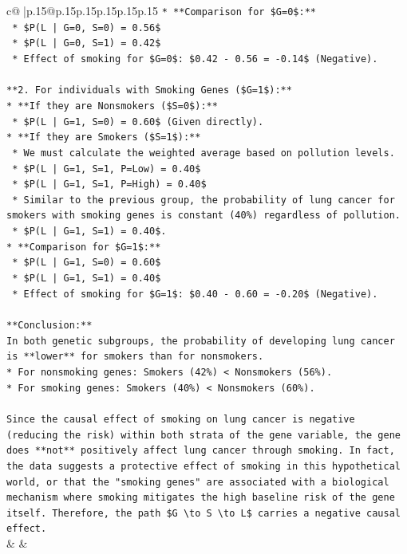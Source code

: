 \documentclass{article}
\begin{document}
{\begin{supertabular}{c@{$\;$}|p{.15\linewidth}@{}p{.15\linewidth}p{.15\linewidth}p{.15\linewidth}p{.15\linewidth}p{.15\linewidth}}
{{{\texttt{*   **Comparison for \$G=0\$:**} \\
\texttt{    *   \$P(L | G=0, S=0) = 0.56\$} \\
\texttt{    *   \$P(L | G=0, S=1) = 0.42\$} \\
\texttt{    *   Effect of smoking for \$G=0\$: \$0.42 {-} 0.56 = {-}0.14\$ (Negative).} \\
\\ 
\texttt{**2. For individuals with Smoking Genes (\$G=1\$):**} \\
\texttt{*   **If they are Nonsmokers (\$S=0\$):**} \\
\texttt{    *   \$P(L | G=1, S=0) = 0.60\$ (Given directly).} \\
\texttt{*   **If they are Smokers (\$S=1\$):**} \\
\texttt{    *   We must calculate the weighted average based on pollution levels.} \\
\texttt{    *   \$P(L | G=1, S=1, P=Low) = 0.40\$} \\
\texttt{    *   \$P(L | G=1, S=1, P=High) = 0.40\$} \\
\texttt{    *   Similar to the previous group, the probability of lung cancer for smokers with smoking genes is constant (40\%) regardless of pollution.} \\
\texttt{    *   \$P(L | G=1, S=1) = 0.40\$.} \\
\texttt{*   **Comparison for \$G=1\$:**} \\
\texttt{    *   \$P(L | G=1, S=0) = 0.60\$} \\
\texttt{    *   \$P(L | G=1, S=1) = 0.40\$} \\
\texttt{    *   Effect of smoking for \$G=1\$: \$0.40 {-} 0.60 = {-}0.20\$ (Negative).} \\
\\ 
\texttt{**Conclusion:**} \\
\texttt{In both genetic subgroups, the probability of developing lung cancer is **lower** for smokers than for nonsmokers.} \\
\texttt{*   For nonsmoking genes: Smokers (42\%) < Nonsmokers (56\%).} \\
\texttt{*   For smoking genes: Smokers (40\%) < Nonsmokers (60\%).} \\
\\ 
\texttt{Since the causal effect of smoking on lung cancer is negative (reducing the risk) within both strata of the gene variable, the gene does **not** positively affect lung cancer through smoking. In fact, the data suggests a protective effect of smoking in this hypothetical world, or that the "smoking genes" are associated with a biological mechanism where smoking mitigates the high baseline risk of the gene itself. Therefore, the path \$G \textbackslash{}to S \textbackslash{}to L\$ carries a negative causal effect.} \\
            }
        }
    }
    & & \\ \\


\end{supertabular}}
\end{document}
